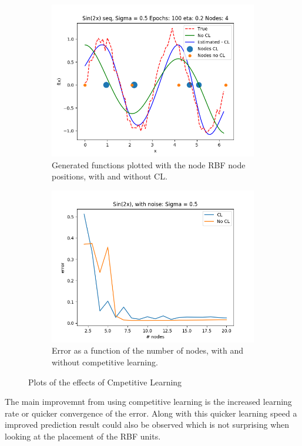 \documentclass{article}
\begin{document}
\begin{figure}[ht!]
    \centering
    \begin{subfigure}[t]{0.4\textwidth}
        \centering
        \includegraphics[width=1\textwidth]{plots/cl/sin2x_seq_CL_vs_no_cl_plots}
        \caption{Generated functions plotted with the node RBF node positions, with and without CL.}
    \end{subfigure}
    \begin{subfigure}[t]{0.4\textwidth}
        \centering
        \includegraphics[width=1\textwidth]{plots/cl/sin2x_seq_CL_vs_no_cl_plots_error}
        \caption{Error as a function of the number of nodes, with and without competitive learning.}
    \end{subfigure}
    \caption{Plots of the effects of Cmpetitive Learning}
\end{figure}
\FloatBarrier
The main improvemnt from using competitive learning is the increased learning rate or quicker convergence of the error. Along with this quicker learning speed a improved prediction result could also be observed which is not surprising when looking at the placement of the RBF units.
\end{document}
